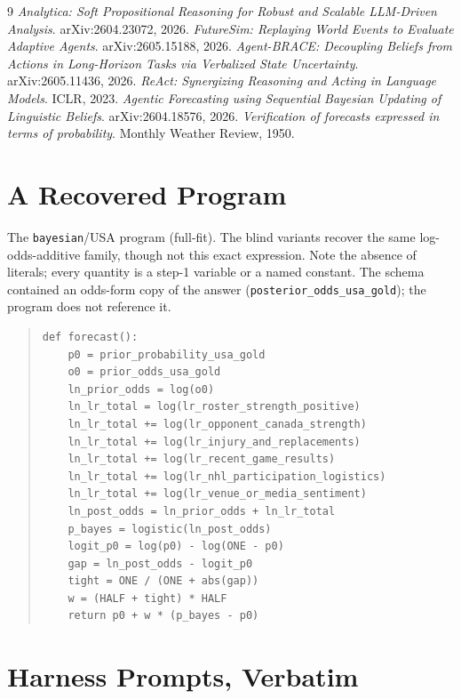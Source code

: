\documentclass[10pt]{article}
\newcommand{\hr}[1]{\texttt{#1}}
\begin{document}
\begin{thebibliography}{9}\small
{} \emph{Analytica: Soft Propositional Reasoning for Robust and
Scalable LLM-Driven Analysis}. arXiv:2604.23072, 2026.
 \emph{FutureSim: Replaying World Events to Evaluate Adaptive Agents}.
arXiv:2605.15188, 2026.
 \emph{Agent-BRACE: Decoupling Beliefs from Actions in Long-Horizon Tasks via
Verbalized State Uncertainty}. arXiv:2605.11436, 2026.
 \emph{ReAct: Synergizing Reasoning and Acting in Language Models}.
ICLR, 2023.
 \emph{Agentic Forecasting using Sequential Bayesian Updating of Linguistic Beliefs}.
arXiv:2604.18576, 2026.
 \emph{Verification of forecasts expressed in terms of probability}.
Monthly Weather Review, 1950.
\end{thebibliography}

\appendix
\section{A Recovered Program}\label{app:prog}
The \hr{bayesian}/USA program (full-fit). The blind variants recover the same log-odds-additive
family, though not this exact expression. Note the absence of literals; every quantity is a step-1
variable or a named constant. The schema contained an odds-form copy of the answer
(\texttt{posterior\_odds\_usa\_gold}); the program does not reference it.
\begin{quote}\small\begin{verbatim}
def forecast():
    p0 = prior_probability_usa_gold
    o0 = prior_odds_usa_gold
    ln_prior_odds = log(o0)
    ln_lr_total = log(lr_roster_strength_positive)
    ln_lr_total += log(lr_opponent_canada_strength)
    ln_lr_total += log(lr_injury_and_replacements)
    ln_lr_total += log(lr_recent_game_results)
    ln_lr_total += log(lr_nhl_participation_logistics)
    ln_lr_total += log(lr_venue_or_media_sentiment)
    ln_post_odds = ln_prior_odds + ln_lr_total
    p_bayes = logistic(ln_post_odds)
    logit_p0 = log(p0) - log(ONE - p0)
    gap = ln_post_odds - logit_p0
    tight = ONE / (ONE + abs(gap))
    w = (HALF + tight) * HALF
    return p0 + w * (p_bayes - p0)
\end{verbatim}\end{quote}

\section{Harness Prompts, Verbatim}\label{app:prompts}
\end{document}
